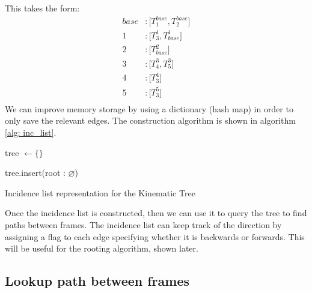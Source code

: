 This takes the form:
\begin{align}
	base &: \big[ T^{base}_1, T^{base}_2\big] \\
	1 &: \big[ T^1_3, T^1_{base} \big]\\
	2 &: \big[ T^2_{base}\big]\\
	3 &: \big[ T_4^3, T_5^3 \big] \\
	4 &: \big[ T_3^4\big] \\
	5 &: \big[ T_3^5\big] \\
\end{align}
We can improve memory storage by using a dictionary (hash map) in order to only save the relevant edges. 
The construction algorithm is shown in algorithm \ref{alg: inc_list}.

\begin{algorithm}
	\DontPrintSemicolon
	tree $\gets \{\}$

	tree.insert(root : $\varnothing$)


	\caption{Incidence list representation for the Kinematic Tree}
	\label{alg: inc_list}
\end{algorithm}

Once the incidence list is constructed, then we can use it to query the tree to find paths between frames.
The incidence list can keep track of the direction by assigning a flag to each edge specifying whether it is backwards or forwards. 
This will be useful for the rooting algorithm, shown later. 

\subsection{Lookup path between frames}

